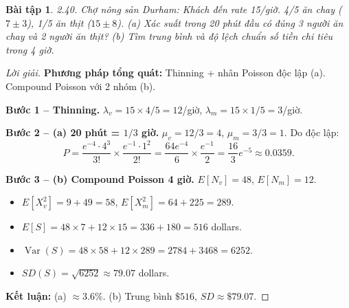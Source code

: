\documentclass[8pt,a4paper]{article}
\newtheorem{exercise}{Bài tập}
\newenvironment{solution}{\begin{proof}[Lời giải]}{\end{proof}}
\newcommand{\Var}{\operatorname{Var}}
\begin{document}
\begin{exercise}
2.40. Chợ nông sản Durham: Khách đến rate 15/giờ. 4/5 ăn chay ($7 \pm 3$), 1/5 ăn thịt ($15 \pm 8$).
(a) Xác suất trong 20 phút đầu có đúng 3 người ăn chay và 2 người ăn thịt?
(b) Tìm trung bình và độ lệch chuẩn số tiền chi tiêu trong 4 giờ.
\end{exercise}
\begin{solution}
\textbf{Phương pháp tổng quát:} Thinning + nhân Poisson độc lập (a). Compound Poisson với 2 nhóm (b).

\textbf{Bước 1 -- Thinning.} $\lambda_v = 15 \times 4/5 = 12$/giờ, $\lambda_m = 15 \times 1/5 = 3$/giờ.

\textbf{Bước 2 -- (a) 20 phút = $1/3$ giờ.} $\mu_v = 12/3 = 4$, $\mu_m = 3/3 = 1$. Do độc lập:
\[
  P = \frac{e^{-4} \cdot 4^3}{3!} \times \frac{e^{-1} \cdot 1^2}{2!} = \frac{64e^{-4}}{6} \times \frac{e^{-1}}{2} = \frac{16}{3}e^{-5} \approx \boxed{0.0359}.
\]

\textbf{Bước 3 -- (b) Compound Poisson 4 giờ.} $E[N_v] = 48$, $E[N_m] = 12$.
\begin{itemize}[nosep]
  \item $E[X_v^2] = 9 + 49 = 58$, $E[X_m^2] = 64 + 225 = 289$.
  \item $E[S] = 48 \times 7 + 12 \times 15 = 336 + 180 = \boxed{516}$ dollars.
  \item $\Var(S) = 48 \times 58 + 12 \times 289 = 2784 + 3468 = 6252$.
  \item $SD(S) = \sqrt{6252} \approx \boxed{79.07}$ dollars.
\end{itemize}

\textbf{Kết luận:} (a) $\approx 3.6\%$. (b) Trung bình $\$516$, $SD \approx \$79.07$.
\end{solution}
\end{document}
